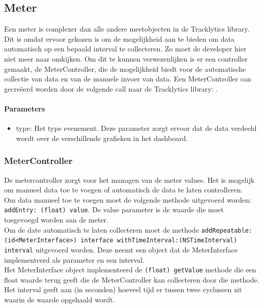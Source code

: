 \subsection{Meter}
Een meter is complexer dan alle andere meetobjecten in de Tracklytics library. Dit is omdat ervoor gekozen is om de mogelijkheid aan te bieden om data automatisch op een bepaald interval te collecteren. Zo moet de developer hier niet meer naar omkijken. Om dit te kunnen verwezenlijken is er een controller gemaakt, de MeterController, die de mogelijkheid biedt voor de automatische collectie van data en van de manuele invoer van data. Een MeterController can gecre\"eerd worden door de volgende call naar de Tracklytics library: \texttt{}. 

\paragraph{Parameters}
\begin{itemize}
\item type: Het type evenement. Deze parameter zorgt ervoor dat de data verdeeld wordt over de verschillende grafieken in het dashboard.
\end{itemize}

\subsubsection{MeterController}
De metercontroller zorgt voor het managen van de meter values. Het is mogelijk om manueel data toe te voegen of automatisch de data te laten controlleren. \\

Om data manueel toe te voegen moet de volgende methode uitgevoerd worden: \texttt{\justify addEntry: (float) value}. De value parameter is de waarde die moet toegevoegd worden aan de meter. \\

Om de date automatisch te laten collecteren moet de methode \texttt{\justify addRepeatable:(id<MeterInterface>) interface withTimeInterval:(NSTimeInterval) interval} uitgevoerd worden. Deze neemt een object dat de MeterInterface implementeerd als parameter en een interval.\\
Het MeterInterface object implementeerd de \texttt{\justify (float) getValue} methode die een float waarde terug geeft die de MeterController kan collecteren door die methode.\\
Het interval geeft aan (in seconden) hoeveel tijd er tussen twee cyclussen zit waarin de waarde opgehaald wordt.



